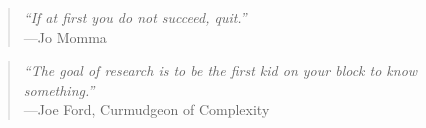 \vspace{2in}

\begin{quotation}
  {\it ``If at first you do not succeed, quit.''} \\
  \hspace*{1in}---Jo Momma
\end{quotation}

\vspace{1in}

\begin{quotation}
  {\it ``The goal of research is to be the first kid on your block to
    know something.''} \\ 
  \hspace*{1in}---Joe Ford, Curmudgeon of Complexity
\end{quotation}
